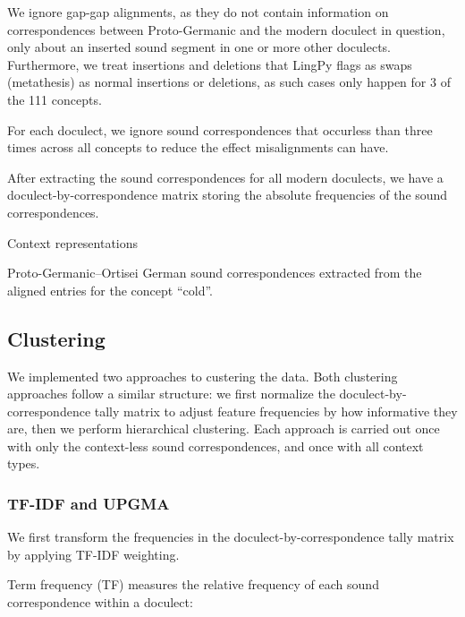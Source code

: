 \documentclass[a4paper]{article}
\begin{document}
We ignore gap-gap alignments,
as they do not contain information on correspondences
between Proto-Germanic and the modern doculect in question,
only about an inserted sound segment in one or more other doculects.
Furthermore, we treat insertions and deletions
that LingPy flags as swaps (metathesis) as normal insertions or deletions,
as such cases only happen for 3 of the 111 concepts.

For each doculect, we ignore sound correspondences
that occurless than three times across all concepts
to reduce the effect misalignments can have. 

After extracting the sound correspondences for
all modern doculects, we have a doculect-by-correspondence
matrix storing the absolute frequencies of the sound correspondences.

\begin{table}[]

\caption{Context representations}
\label{tab:context}
\end{table}

\begin{table}[h]

\caption{
Proto-Germanic--Ortisei German sound correspondences
extracted from the aligned entries for the concept ``cold''.}
\label{tab:corres}
\end{table}


\subsection{Clustering}
\label{subsec:clustering}

We implemented two approaches to custering the data.
Both clustering approaches follow a similar structure:
we first normalize the doculect-by-correspondence tally matrix
to adjust feature frequencies by how informative they are,
then we perform hierarchical clustering.
Each approach is carried out once with only
the context-less sound correspondences,
and once with all context types.

\subsubsection{TF-IDF and UPGMA}
\label{subsubsec:upgma}

We first transform the frequencies
in the doculect-by-correspondence tally matrix
by applying TF-IDF weighting.

Term frequency (TF) measures the relative frequency
of each sound correspondence within a doculect:
\end{document}
